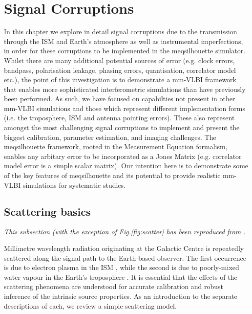 \section{Signal Corruptions}
In this chapter we explore in detail signal corruptions due to the transmission through the ISM and Earth's atmosphere as well as instrumental imperfections, in order for these corruptions to be implemented in the {\sc meqsilhouette} simulator. 
Whilst there are many additional potential sources of error (e.g. clock errors, bandpass, polarisation leakage, phasing errors, quantisation, correlator model etc.), the point of this investigation is to demonstrate a mm-VLBI framework that enables more sophisticated interferometric simulations than have previously been performed. As such, we have focused on capabilties not present in other mm-VLBI simulations and those which represent different implementation forms (i.e. the troposphere, ISM and antenna pointing errors). These also represent amongst the most challenging signal corruptions to implement and present the biggest calibration, parameter estimation, and imaging challenges. The {\sc meqsilhouette} framework, rooted in the Measurement Equation formalism, enables any arbitary error to be incorporated as a Jones Matrix (e.g. correlator model error is a simple scalar matrix). Our intention here is to demonstrate some of the key features of {\sc meqsilhouette} and its potential to provide realistic mm-VLBI simulations for systematic studies.

\subsection{Scattering basics}\label{sec:basic_scat}

{\it This subsection (with the exception of Fig.\ref{fig:scatter} has been reproduced from \citet{Blecher_2016}.}

Millimetre wavelength radiation originating at the Galactic Centre is repeatedly scattered along the signal path to the Earth-based observer. The first occurrence is due to electron plasma in the ISM \citep[e.g.][]{Bower_2006,Gwinn_2014}, while the second is due to poorly-mixed water vapour in the Earth's troposphere \citep*[e.g.][]{Lay_1997,Carilli_1999}. It is essential that the effects of the scattering phenomena are understood for accurate calibration and robust inference of the intrinsic source properties. As an introduction to the separate descriptions of each, we review a simple scattering model.

